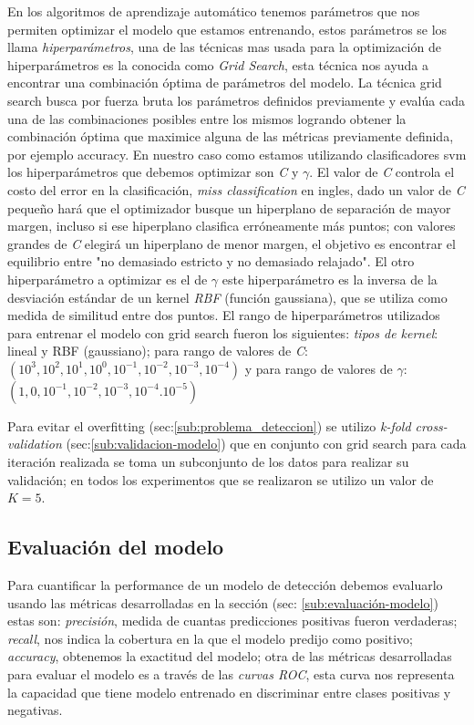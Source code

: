 En los algoritmos de aprendizaje automático tenemos parámetros que nos permiten optimizar el modelo que estamos entrenando, estos  parámetros se los llama \textit{hiperparámetros}, una de las técnicas mas usada para la optimización de hiperparámetros es la conocida como \textit{Grid Search}, esta técnica nos ayuda a encontrar una combinación óptima de parámetros del modelo. La técnica grid search busca por fuerza bruta los parámetros definidos previamente y evalúa cada una de las combinaciones posibles entre los mismos logrando obtener la combinación óptima que maximice alguna de las métricas previamente definida, por ejemplo accuracy.  En nuestro caso como estamos utilizando clasificadores \ac{svm} los hiperparámetros que debemos optimizar son \textit{C} y $\gamma$. El valor de \textit{C} controla el costo del error en la clasificación, \textit{miss classification} en ingles, dado un valor de \textit{C} pequeño hará que el optimizador busque un hiperplano de separación de mayor margen, incluso si ese hiperplano clasifica erróneamente más puntos; con valores grandes de \textit{C}  elegirá un hiperplano de menor margen, el objetivo es encontrar el equilibrio entre "no demasiado estricto y  no demasiado relajado". El otro hiperparámetro a  optimizar es el de  $\gamma$ este hiperparámetro es la inversa de la desviación estándar de un kernel \textit{RBF} (función gaussiana), que se utiliza como medida de similitud entre dos puntos.
El rango de hiperparámetros utilizados para entrenar el modelo con grid search fueron los siguientes: \textit{tipos de kernel}: lineal y RBF (gaussiano); para rango de valores de \textit{C}: $(10^{3}, 10^{2}, 10^{1}, 10^{0}, 10^{-1},10^{-2}, 10^{-3}, 10^{-4})$
    y para rango de valores de $\gamma$: $(1,0,10^{-1}, 10^{-2},10^{-3},10^{-4}. 10^{-5})$
    
Para evitar el overfitting (sec:\ref{sub:problema_deteccion}) se utilizo \textit{k-fold cross-validation} (sec:\ref{sub:validacion-modelo}) que en conjunto con grid search para cada  iteración realizada se toma un subconjunto de los datos para realizar su validación; en todos los experimentos que se realizaron se utilizo un valor de $K = 5$.


\subsection*{Evaluación del modelo}\label{sub:evaluacion_class}

Para cuantificar la performance de un modelo de detección debemos evaluarlo usando las métricas desarrolladas en la sección (sec: \ref{sub:evaluación-modelo}) estas son: \textit{precisión}, medida de cuantas predicciones positivas fueron verdaderas; \textit{recall}, nos indica la cobertura en la que el modelo predijo como positivo; \textit{accuracy}, obtenemos la exactitud del modelo; otra de las métricas desarrolladas para evaluar el modelo es a través de las \textit{curvas ROC}, esta curva nos representa la capacidad que tiene modelo entrenado en discriminar entre clases positivas y negativas.

